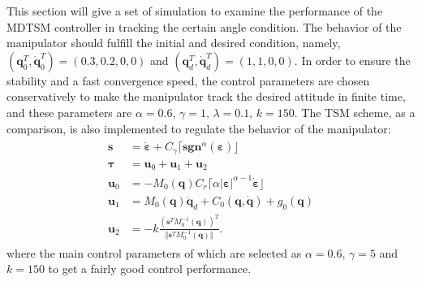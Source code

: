 \documentclass[3p]{elsarticle}
\theoremstyle{plain}
\theoremstyle{remark}
\begin{document}
This section will give a set of simulation to examine the performance of the MDTSM controller in tracking the certain angle condition. The behavior of the manipulator should fulfill the initial and desired condition, namely, $(\bm q_0^T, \dot{\bm q}_0^T)= (0.3,0.2,0,0)$ and $({\bm q}_d^T,\dot{\bm q}_d^T)=(1,1,0,0)$. In order to ensure the stability and a fast convergence speed, the control parameters are chosen conservatively to make the manipulator track the desired attitude in finite time, and these parameters are $\alpha = 0.6$, $\gamma = 1$, $\lambda = 0.1$, $k = 150$. The TSM scheme, as a comparison, is also implemented to regulate the behavior of the manipulator:
\begin{align}
\begin{split}
\bm s &= \dot{\bm \varepsilon}+C_\gamma\lceil\bm{sgn}^\alpha(\bm \varepsilon)\rfloor\\
\bm\tau &= \bm u_0+\bm u_1 +\bm u_2\\
\bm u_0 &= -M_0(\bm q)C_r\lceil\alpha\vert\bm\varepsilon\vert^{\alpha-1}\dot{\bm \varepsilon}\rfloor\\
\bm u_1 &= M_0(\bm q)\ddot {\bm q}_d+C_0(\bm q,\dot {\bm q})+g_0(\bm q)\\
\bm u_2 &= -k\frac{(\bm s^TM_0^{-1}(\bm q))^T}{\Vert\bm s^TM_0^{-1}(\bm q)\Vert}.
\end{split}
\end{align}
where the main control parameters of which are selected as $\alpha = 0.6$, $\gamma = 5$ and $k = 150$ to get a fairly good control performance.
\end{document}
